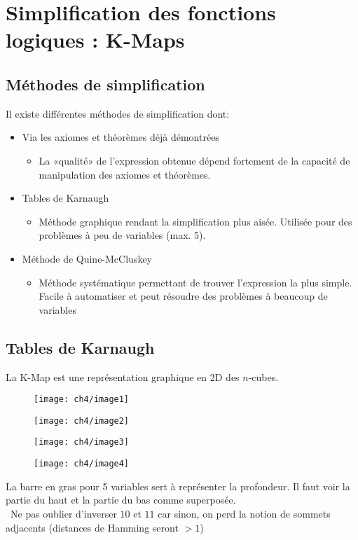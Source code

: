 \chapter{Simplification des fonctions logiques : K-Maps}
\section{Méthodes de simplification}
Il existe différentes méthodes de simplification dont:
\begin{itemize}
	\item Via les axiomes et théorèmes déjà démontrées
	\begin{itemize}
		\item La «qualité» de l'expression obtenue dépend fortement de la capacité de manipulation des axiomes et théorèmes.
	\end{itemize}
	\item Tables de Karnaugh
	\begin{itemize}
		\item Méthode graphique rendant la simplification plus aisée. Utilisée pour des problèmes à peu de variables (max. 5).
	\end{itemize}
	\item Méthode de Quine-McCluskey
	\begin{itemize}
		\item Méthode systématique permettant de trouver l'expression la plus simple. Facile à automatiser et peut résoudre des problèmes à beaucoup de variables
	\end{itemize}
\end{itemize}
\section{Tables de Karnaugh}
La K-Map est une représentation graphique en 2D des $n$-cubes.
\begin{figure}[H]
	\begin{minipage}{0.5\textwidth}
		\centering
		\texttt{[image: ch4/image1]}
	\end{minipage}
	\begin{minipage}{0.5\textwidth}
		\centering
		\texttt{[image: ch4/image2]}
	\end{minipage}\vspace{1cm}
	\begin{minipage}{0.5\textwidth}
		\centering
		\texttt{[image: ch4/image3]}
	\end{minipage}
	\begin{minipage}{0.5\textwidth}
		\centering
		\texttt{[image: ch4/image4]}
	\end{minipage}
\end{figure}
La barre en gras pour 5 variables sert à représenter la profondeur. Il faut voir la partie du haut et la partie du bas comme superposée.\\
\danger\ Ne pas oublier d'inverser $10$ et $11$ car sinon, on perd la notion de sommets adjacents (distances de Hamming seront $>1$)
